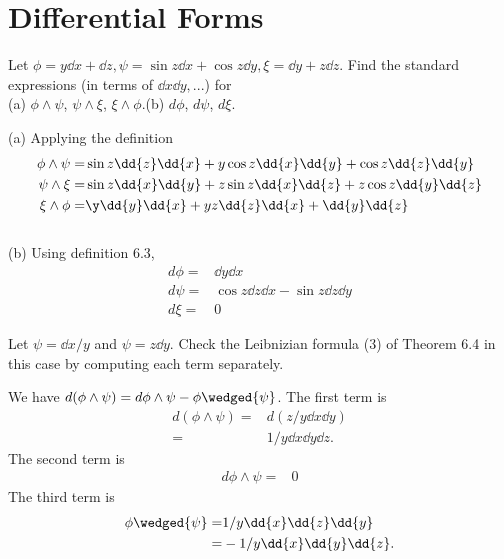 \section{Differential Forms}

\begin{problem}{1}
  Let \(\phi=y\dd{x}+\dd{z},\psi=\sin{z}\dd{x} + \cos{z}\dd{y}, \xi=\dd{y} + z\dd{z}\). Find the standard expressions (in terms of \(\dd{x}\dd{y},...\)) for \\
  (a) \(\phi\wedge\psi \), \(\psi\wedge\xi \), \(\xi\wedge\phi \).\quad\quad (b) \(d{\phi} \), \(d{\psi} \), \(d{\xi} \).
\end{problem}
\begin{sol}
  (a) Applying the definition
  \begin{align}
    \phi\wedge\psi=&\sin{z}\dd{z}\dd{x}+y\cos{z}\dd{x}\dd{y}+\cos{z}\dd{z}\dd{y}\\
    \psi\wedge\xi=&\sin{z}\dd{x}\dd{y}+z\sin{z}\dd{x}\dd{z}+z\cos{z}\dd{y}\dd{z}\\
    \xi\wedge\phi=&\y\dd{y}\dd{x}+yz\dd{z}\dd{x}+\dd{y}\dd{z}
  \end{align}\\
  (b) Using definition 6.3,
  \begin{align}
    d{\phi}=&\dd{y}\dd{x}\\
    d{\psi}=&\cos{z}\dd{z}\dd{x}-\sin{z}\dd{z}\dd{y}\\
    d{\xi}=& 0
  \end{align}
\end{sol}

\begin{problem}{2}
  Let \(\psi=\dd{x}/y \) and \(\psi=z\dd{y}\). Check the Leibnizian formula (3) of Theorem 6.4 in this case by computing each term separately.
\end{problem}
\begin{sol}
  We have \(d{(\phi\wedge\psi )}=d{\phi}\wedge\psi-\phi\wedged{\psi}\). The first term is
  \begin{align}
    d{(\phi\wedge\psi)}=&d{(z/y\dd{x}\dd{y})}\\
    =&1/y\dd{x}\dd{y}\dd{z}.
  \end{align}
  The second term is
  \begin{align}
    d{\phi}\wedge\psi=&0
  \end{align}
  The third term is
  \begin{align}
    \phi\wedged{\psi }=&1/y\dd{x}\dd{z}\dd{y}\\
    =&-1/y\dd{x}\dd{y}\dd{z}.
  \end{align}
\end{sol}

